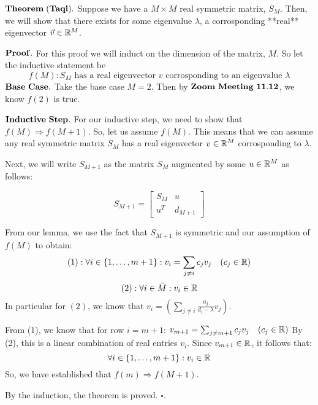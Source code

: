 $\bf Theorem \; (Taqi).$ Suppose we have a $M \times M$ real symmetric matrix, $S_M$. Then, we will show that there exists for some eigenvalue $\lambda$, a corrosponding **real** eigenvector $\vec{v} \in \mathbb{R}^M$.

$\bf Proof.$ For this proof we will induct on the dimension of the matrix, $M$. So let the inductive statement be
$$f(M) : S_M\text{ has a real eigenvector } v \text{ corrosponding to an eigenvalue } \lambda$$
$\bf Base \,\, Case.$ Take the base case $M = 2$. Then by $\bf Zoom \,\,Meeting\,\, 11.12$, we know $f(2)$ is true.

$\bf Inductive \,\, Step.$ For our inductive step, we need to show that $f(M) \Rightarrow f(M+1)$. So, let us assume $f(M)$. This means that we can assume any real symmetric matrix $S_M$ has a real eigenvector $v \in \mathbb{R}^M$ corrosponding to $\lambda$.

Next, we will write $S_{M+1}$ as the matrix $S_M$ augmented by some $u \in \mathbb{R}^M$ as follows:

$$ S_{M+1} =
\left[
  \begin{array}{c|c}
  S_M & u\\ 
  \hline
  u^T & d_{M+1} 
\end{array} \right]$$

From our lemma, we use the fact that $S_{M+1}$ is symmetric and our assumption of $f(M)$ to obtain:
$$(1): \forall i \in \{1,\dots,m+1\}: v_i =  {\sum_{j \neq i} c_j v_j} \quad (c_j \in \mathbb{R})$$
$$(2): \forall i \in \tilde{M} : v_i \in \mathbb{R}$$
In particular for $(2)$, we know that $v_i = \left({\sum_{j \neq i} \frac{a_j}{d_i-\lambda} v_j}\right)$.


From (1), we know that for row $i = m+1$:
$v_{m+1} =  {\sum_{j \neq {m+1}} c_j v_j} \quad (c_j \in \mathbb{R})$
By (2), this is a linear combination of real entries $v_i$. Since $v_{m+1} \in \mathbb{R}$, it follows that:
$$\forall i \in \{1,\dots,m+1\}: v_i \in \mathbb{R}$$
So, we have established that $f(m) \Rightarrow f(M+1)$.

By the induction, the theorem is proved. $\square$.



